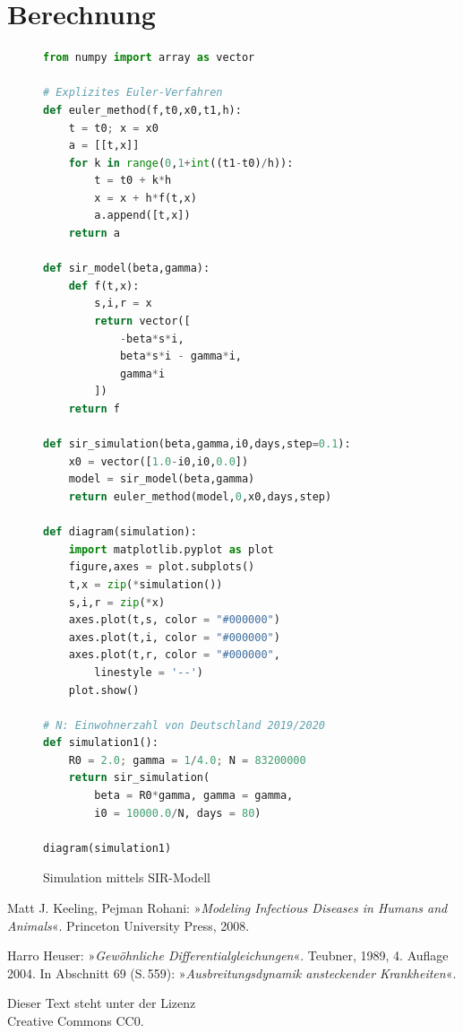 \documentclass[a4paper,10pt,fleqn,twocolumn,twoside,dvipdfmx]{scrartcl}
\numberwithin{equation}{section}
\begin{document}
\newpage
\section{Berechnung}

\begin{figure}[h!]
\begin{lstlisting}[language=Python]
from numpy import array as vector

# Explizites Euler-Verfahren
def euler_method(f,t0,x0,t1,h):
    t = t0; x = x0
    a = [[t,x]]
    for k in range(0,1+int((t1-t0)/h)):
        t = t0 + k*h
        x = x + h*f(t,x)
        a.append([t,x])
    return a

def sir_model(beta,gamma):
    def f(t,x):
        s,i,r = x
        return vector([
            -beta*s*i,
            beta*s*i - gamma*i,
            gamma*i
        ])
    return f

def sir_simulation(beta,gamma,i0,days,step=0.1):
    x0 = vector([1.0-i0,i0,0.0])
    model = sir_model(beta,gamma)
    return euler_method(model,0,x0,days,step)

def diagram(simulation):
    import matplotlib.pyplot as plot
    figure,axes = plot.subplots()
    t,x = zip(*simulation())
    s,i,r = zip(*x)
    axes.plot(t,s, color = "#000000")
    axes.plot(t,i, color = "#000000")
    axes.plot(t,r, color = "#000000",
        linestyle = '--')
    plot.show()

# N: Einwohnerzahl von Deutschland 2019/2020
def simulation1():
    R0 = 2.0; gamma = 1/4.0; N = 83200000
    return sir_simulation(
        beta = R0*gamma, gamma = gamma,
        i0 = 10000.0/N, days = 80)

diagram(simulation1)
\end{lstlisting}
\caption{Simulation mittels SIR-Modell}
\end{figure}

\newpage
\begin{thebibliography}{00}
 Matt J. Keeling, Pejman Rohani:
»\emph{Modeling Infectious Diseases in Humans and Animals}«.
Princeton University Press, 2008.

 Harro Heuser: »\emph{Gewöhnliche Differentialgleichungen}«.
Teubner, 1989, 4. Auflage 2004. In Abschnitt 69 (S.\,559):
»\emph{Ausbreitungsdynamik ansteckender Krankheiten}«.
\end{thebibliography}
\vfill

\noindent
{\small Dieser Text steht unter der Lizenz\\
Creative Commons CC0.}
\end{document}
